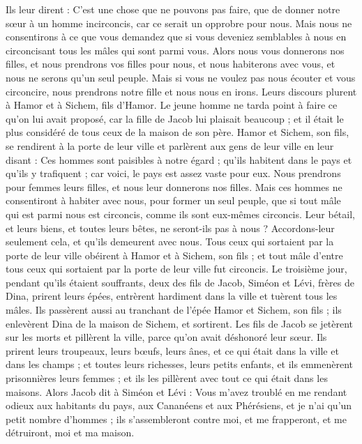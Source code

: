\begin{multicols}{2}
Ils leur dirent : C’est une chose que ne pouvons pas faire, que de donner notre sœur à un homme incirconcis, car ce serait un opprobre pour nous.
Mais nous ne consentirons à ce que vous demandez que si vous deveniez semblables à nous en circoncisant tous les mâles qui sont parmi vous.
Alors nous vous donnerons nos filles, et nous prendrons vos filles pour nous, et nous habiterons avec vous, et nous ne serons qu'un seul peuple.
Mais si vous ne voulez pas nous écouter et vous circoncire, nous prendrons notre fille et nous nous en irons.
Leurs discours plurent à Hamor et à Sichem, fils d'Hamor.
Le jeune homme ne tarda point à faire ce qu'on lui avait proposé, car la fille de Jacob lui plaisait beaucoup ; et il était le plus considéré de tous ceux de la maison de son père.
Hamor et Sichem, son fils, se rendirent à la porte de leur ville et parlèrent aux gens de leur ville en leur disant :
Ces hommes sont paisibles à notre égard ; qu'ils habitent dans le pays et qu'ils y trafiquent ; car voici, le pays est assez vaste pour eux. Nous prendrons pour femmes leurs filles, et nous leur donnerons nos filles.
Mais ces hommes ne consentiront à habiter avec nous, pour former un seul peuple, que si tout mâle qui est parmi nous est circoncis, comme ils sont eux-mêmes circoncis.
Leur bétail, et leurs biens, et toutes leurs bêtes, ne seront-ils pas à nous ? Accordons-leur seulement cela, et qu'ils demeurent avec nous.
Tous ceux qui sortaient par la porte de leur ville obéirent à Hamor et à Sichem, son fils ; et tout mâle d'entre tous ceux qui sortaient par la porte de leur ville fut circoncis.
Le troisième jour, pendant qu’ils étaient souffrants, deux des fils de Jacob, Siméon et Lévi, frères de Dina, prirent leurs épées, entrèrent hardiment dans la ville et tuèrent tous les mâles.
Ils passèrent aussi au tranchant de l'épée Hamor et Sichem, son fils ; ils enlevèrent Dina de la maison de Sichem, et sortirent.
Les fils de Jacob se jetèrent sur les morts et pillèrent la ville, parce qu'on avait déshonoré leur sœur.
Ils prirent leurs troupeaux, leurs bœufs, leurs ânes, et ce qui était dans la ville et dans les champs ;
et toutes leurs richesses, leurs petits enfants, et ils emmenèrent prisonnières leurs femmes ; et ils les pillèrent avec tout ce qui était dans les maisons.
Alors Jacob dit à Siméon et Lévi : Vous m'avez troublé en me rendant odieux aux habitants du pays, aux Cananéens et aux Phérésiens, et je n'ai qu’un petit nombre d’hommes ; ils s'assembleront contre moi, et me frapperont, et me détruiront, moi et ma maison.

\end{multicols}
